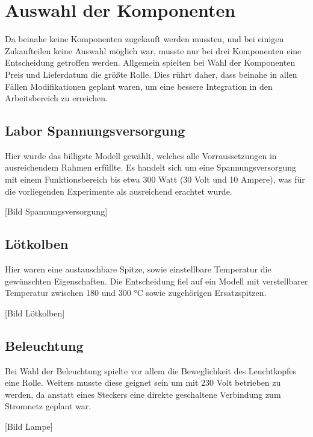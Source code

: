 \section{Auswahl der Komponenten}

Da beinahe keine Komponenten zugekauft werden mussten, und bei einigen Zukaufteilen keine Auswahl möglich war, musste nur bei drei Komponenten eine Entscheidung getroffen werden.
Allgemein spielten bei Wahl der Komponenten Preis und Lieferdatum die größte Rolle.
Dies rührt daher, dass beinahe in allen Fällen Modifikationen geplant waren, um eine bessere Integration in den Arbeitsbereich zu erreichen.

\subsection{Labor Spannungsversorgung}

Hier wurde das billigste Modell gewählt, welches alle Vorraussetzungen in ausreichendem Rahmen erfüllte.
Es handelt sich um eine Spannungsversorgung mit einem Funktionsbereich bis etwa 300 Watt (30 Volt und 10 Ampere), was für die vorliegenden Experimente als ausreichend erachtet wurde.

[Bild Spannungsversorgung]

\subsection{Lötkolben}

Hier waren eine austauschbare Spitze, sowie einstellbare Temperatur die gewünschten Eigenschaften.
Die Entscheidung fiel auf ein Modell mit verstellbarer Temperatur zwischen 180 und 300 °C sowie zugehörigen Ersatzspitzen.

[Bild Lötkolben]

\subsection{Beleuchtung}

Bei Wahl der Beleuchtung spielte vor allem die Beweglichkeit des Leuchtkopfes eine Rolle. 
Weiters musste diese geignet sein um mit 230 Volt betrieben zu werden, da anstatt eines Steckers eine direkte geschaltene Verbindung zum Stromnetz geplant war.

[Bild Lampe]